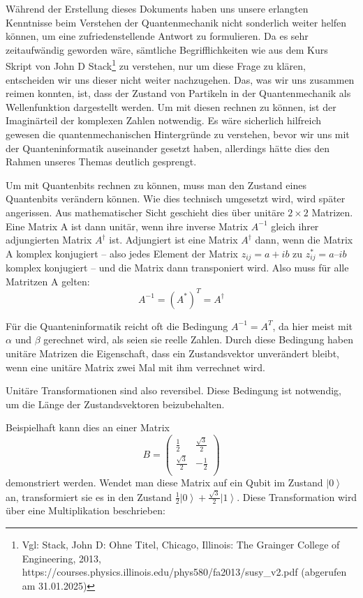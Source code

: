 \begin{tcolorbox}[title=Kommentar,
    title filled=false,
    colback=cyan!5!white,
    colframe=cyan!75!black]
Während der Erstellung dieses Dokuments haben uns unsere erlangten Kenntnisse beim Verstehen der Quantenmechanik nicht sonderlich weiter helfen können, um eine zufriedenstellende Antwort zu formulieren. Da es sehr zeitaufwändig geworden wäre, sämtliche Begrifflichkeiten wie aus dem Kurs Skript von John D Stack\footnote{Vgl: Stack, John D: Ohne Titel, Chicago, Illinois: The Grainger College of Engineering, 2013, https://courses.physics.illinois.edu/phys580/fa2013/susy\_v2.pdf (abgerufen am 31.01.2025)} zu verstehen, nur um diese Frage zu klären, entscheiden wir uns dieser nicht weiter nachzugehen. Das, was wir uns zusammen reimen konnten, ist, dass der Zustand von Partikeln in der Quantenmechanik als Wellenfunktion dargestellt werden. Um mit diesen rechnen zu können, ist der Imaginärteil der komplexen Zahlen notwendig. Es wäre sicherlich hilfreich gewesen die quantenmechanischen Hintergründe zu verstehen, bevor wir uns mit der Quanteninformatik auseinander gesetzt haben, allerdings hätte dies den Rahmen unseres Themas deutlich gesprengt.
\end{tcolorbox}

Um mit Quantenbits rechnen zu können, muss man den Zustand eines Quantenbits verändern können. Wie dies technisch umgesetzt wird, wird später angerissen. Aus mathematischer Sicht geschieht dies über unitäre $2\times2$ Matrizen. \\

Eine Matrix A ist dann unitär, wenn ihre inverse Matrix $A^{-1}$ gleich ihrer adjungierten Matrix $A^\dag$ ist. Adjungiert ist eine Matrix $A^\dag$ dann, wenn die Matrix A komplex konjugiert – also jedes Element der Matrix $z_{ij}=a+ib$ zu $z_{ij}^\ast=a–ib$ komplex konjugiert – und die Matrix dann transponiert wird. Also muss für alle Matritzen A gelten:
$$A^{-1}=(A^*)^T=A^\dag$$

Für die Quanteninformatik reicht oft die Bedingung $A^{-1}=A^T$, da hier meist mit $\alpha$ und $\beta$ gerechnet wird, als seien sie reelle Zahlen. Durch diese Bedingung haben unitäre Matrizen die Eigenschaft, dass ein Zustandsvektor unverändert bleibt, wenn eine unitäre Matrix zwei Mal mit ihm verrechnet wird. 

Unitäre Transformationen sind also reversibel. Diese Bedingung ist notwendig, um die Länge der Zustandsvektoren beizubehalten.

Beispielhaft kann dies an einer Matrix $$B=\left(\begin{matrix}\frac{1}{2}&\frac{\sqrt3}{2}\\\frac{\sqrt3}{2}&-\frac{1}{2}\\\end{matrix}\right)$$ demonstriert werden. Wendet man diese Matrix auf ein Qubit im Zustand $\left|0\right\rangle$ an, transformiert sie es in den Zustand $\frac{1}{2}\left|0\right\rangle+\frac{\sqrt3}{2}\left|1\right\rangle$. Diese Transformation wird über eine Multiplikation beschrieben:

